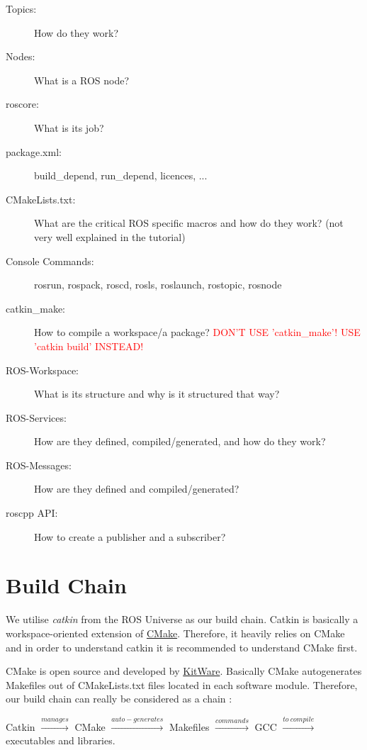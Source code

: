 \begin{description}
  \item [Topics:] How do they work?
  \item [Nodes:] What is a ROS node?
  \item [roscore:] What is its job?
  \item [package.xml:] build\_depend, run\_depend, licences, ...
  \item [CMakeLists.txt:] What are the critical ROS specific macros and how do they work? (not very well explained in the tutorial)
  \item [Console Commands:] rosrun, rospack, roscd, rosls, roslaunch, rostopic, rosnode
  \item [catkin\_make:] How to compile a workspace/a package? \textcolor{red}{DON'T USE 'catkin\_make'! USE 'catkin build' INSTEAD!}
  \item [ROS-Workspace:] What is its structure and why is it structured that way?
  \item [ROS-Services:] How are they defined, compiled/generated, and how do they work?
  \item [ROS-Messages:] How are they defined and compiled/generated?
  \item [roscpp API:] How to create a publisher and a subscriber?
\end{description}

\section{Build Chain}
\label{sec:BuildChain}

We utilise \emph{catkin} from the ROS Universe as our build chain. Catkin is basically a workspace-oriented extension of \href{http://www.cmake.org/}{CMake}. Therefore, it heavily relies on CMake and in order to understand catkin it is recommended to understand CMake first.

CMake is open source and developed by \href{http://www.kitware.com/company/about.html}{KitWare}. Basically CMake autogenerates Makefiles out of CMakeLists.txt files located in each software module. Therefore, our build chain can really be considered as a chain \smiley: 

Catkin $\xrightarrow{manages}$ CMake $\xrightarrow{auto-generates}$ Makefiles $\xrightarrow{commands}$ GCC $\xrightarrow{to\ compile}$ executables and libraries.
